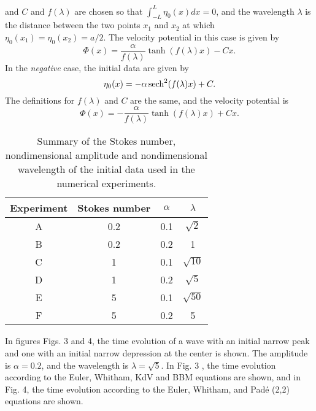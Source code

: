and $C$ and $f(\lambda)$ are chosen so that 
$\int_{-L}^{L}\eta_0(x)dx = 0$, and
the wavelength $\lambda$ is the distance between the 
two points $x_1$ and $x_2$ at which $\eta_0(x_1) = \eta_0(x_2) = a/2$.
The velocity potential in this case is given by
\begin{equation}
\label{velocity1}
\Phi(x) = \frac{\alpha}{f(\lambda)}\tanh(f(\lambda)x)-Cx. 
\end{equation}
In the {\it negative} case, the initial data are given by
\begin{equation*}
\eta_0(x) = - \alpha \operatorname{sech}^2(f(\lambda)x) + C. 
\end{equation*}
The definitions for $f(\lambda)$ and $C$ are the same, and the velocity potential is
\begin{equation*}
\Phi(x) = -\frac{\alpha}{f(\lambda)}\tanh(f(\lambda)x)+Cx. 
\end{equation*}
%
\begin{table}
\begin{center}
	\begin{tabular}{| c | c | c | c |}
	\hline
	Experiment & Stokes number & $\alpha$ & $\lambda$ \\
	\hline
	A	& 0.2  &  	 0.1 &	$\sqrt{2}$ 	\\	
	B	& 0.2  & 	 0.2 &	1 			\\
	C	& 1 	   & 	 0.1 &	$\sqrt{10}$	\\
	D	& 1    & 	 0.2 &	$\sqrt{5}$	\\	
	E	& 5    & 	 0.1 &	$\sqrt{50}$ 	\\
	F	& 5    & 	 0.2 &	5			\\
	\hline
	\end{tabular}
\end{center}
\caption{Summary of the Stokes number, nondimensional amplitude and
nondimensional wavelength of the initial data used in the numerical
experiments.}
\end{table}
%
In figures Figs. 3 and 4, the time evolution of a wave with an initial narrow peak
and one with an initial narrow depression at the center is shown. 
%
The amplitude is $\alpha=0.2$, and the wavelength is $\lambda = \sqrt{5}$. 
In Fig. 3 , the time evolution
according to the Euler, Whitham, KdV and BBM equations are shown,
and in Fig. 4, the time evolution
according to the Euler, Whitham, and Pad\'e (2,2) equations are shown.

